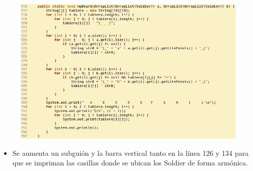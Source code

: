 \documentclass{article}
\begin{document}
	\begin{figure}[H]
		\centering
		\includegraphics[width=1\textwidth,keepaspectratio]{img/boardComplete.jpg}
	\end{figure}
	
	\begin{itemize}	
		\item Se aumenta un subguión y la barra vertical tanto en la línea 126 y 134 para que se impriman las casillas donde se ubican los Soldier de forma armónica.
	\end{itemize}
	
\end{document}
